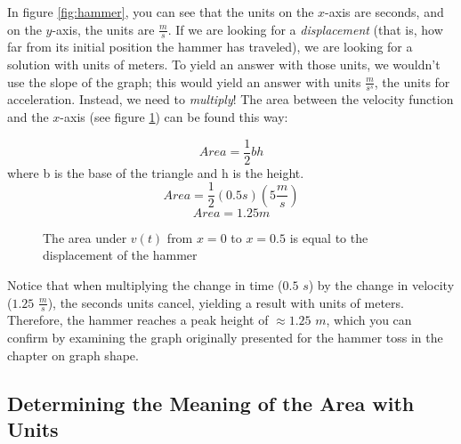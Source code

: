 In figure \ref{fig:hammer}, you can see that the units on the $x$-axis are seconds, and on the $y$-axis, the units are $\frac{m}{s}$. If we are looking for a \textit{displacement} (that is, how far from its initial position the hammer has traveled), we are looking for a solution with units of meters. To yield an answer with those units, we wouldn't use the slope of the graph; this would yield an answer with units $\frac{m}{s^s}$, the units for acceleration. Instead, we need to \textit{multiply}! The area between the velocity function and the $x$-axis (see figure \ref{fig:hammerarea}) can be found this way:

$$Area=\frac{1}{2}bh$$where b is the base of the triangle and h is the height. 
$$Area=\frac{1}{2}(0.5s)(5\frac{m}{s})$$
$$Area=1.25m$$


\begin{figure}[htbp]
	\centering
	\caption{The area under $v(t)$ from $x=0$ to $x=0.5$ is equal to the displacement of the hammer}
	\label{fig:hammerarea}
\end{figure}

Notice that when multiplying the change in time ($0.5$ $s$) by the change in velocity ($1.25$ $\frac{m}{s}$), the seconds units cancel, yielding a result with units of meters. Therefore, the hammer reaches a peak height of $\approx1.25$ $m$, which you can confirm by examining the graph originally presented for the hammer toss in the chapter on graph shape.

\subsection{Determining the Meaning of the Area with Units}


